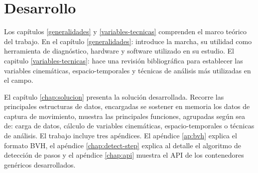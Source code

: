 \section{Desarrollo}

Los capítulos \ref{generalidades} y \ref{variables-tecnicas} comprenden el marco teórico del trabajo. En el capítulo \ref{generalidades}:  introduce la marcha, su utilidad como herramienta de diagnóstico, hardware y software utilizado en su estudio. El capitulo \ref{variables-tecnicas}:  hace una revisión bibliográfica para establecer las variables cinemáticas, espacio-temporales y técnicas de análisis más utilizadas en el campo. 

El capítulo \ref{chap:solucion} presenta la solución desarrollada. Recorre las principales estructuras de datos, encargadas se sostener en memoria los datos de captura de movimiento, muestra las principales funciones, agrupadas según sea de: carga de datos, cálculo de variables cinemáticas, espacio-temporales o técnicas de análisis. El trabajo incluye tres apéndices. El apéndice \ref{ap:bvh} explica el formato BVH, el apéndice \ref{chap:detect-step} explica al detalle el algoritmo de detección de pasos y el apéndice \ref{chap:api} muestra el API de los contenedores genéricos desarrollados. 








